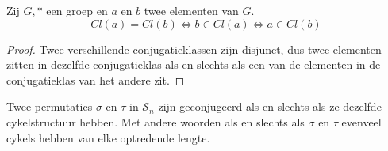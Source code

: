 \documentclass[main.tex]{subfiles}
\begin{document}
\begin{st}
  Zij $G,*$ een groep en $a$ en $b$ twee elementen van $G$.
  \[ Cl(a) = Cl(b) \Leftrightarrow b \in Cl(a) \Leftrightarrow a \in Cl(b) \]

  \begin{proof}
    Twee verschillende conjugatieklassen zijn disjunct, dus twee elementen zitten in dezelfde conjugatieklas als en slechts als een van de elementen in de conjugatieklas van het andere zit.
  \end{proof}
\end{st}

\begin{ei}
  Twee permutaties $\sigma$ en $\tau$ in $\mathcal{S}_{n}$ zijn geconjugeerd als en slechts als ze dezelfde cykelstructuur hebben.
  Met andere woorden als en slechts als $\sigma$ en $\tau$ evenveel cykels hebben van elke optredende lengte.
  

\end{ei}
\end{document}
